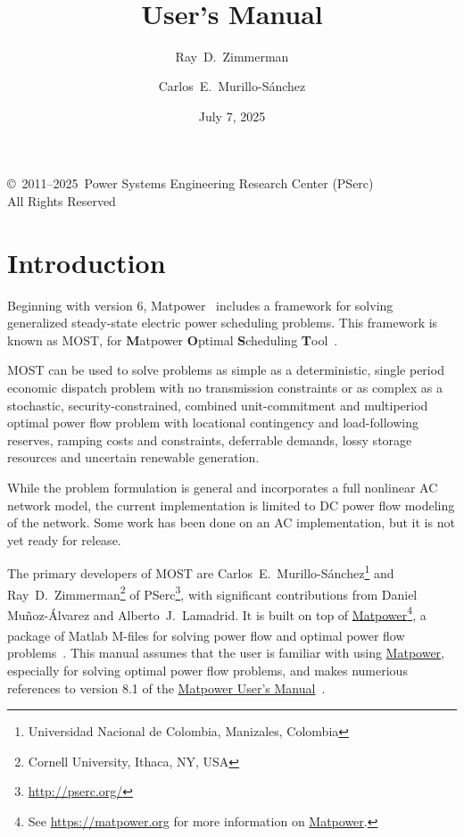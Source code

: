 \documentclass[12pt]{article}
\title{\mostname{}\\\most{} \mostver{}\\
User's Manual}
\author{Ray~D.~Zimmerman \and Carlos~E.~Murillo-S\'anchez}
\date{July 7, 2025} %
\newcommand{\mpver}[0]{8.1}
\newcommand{\matlab}[0]{{\sc Matlab}}
\newcommand{\matpower}[0]{{\sc Matpower}}
\newcommand{\matpowerurl}[0]{https://matpower.org}
\newcommand{\matpowerlink}[0]{\href{\matpowerurl}{\matpower{}}}
\newcommand{\most}[0]{{MOST}}
\newcommand{\mostname}[0]{{{\bf M}{\sc atpower} \textbf{O}ptimal \textbf{S}cheduling \textbf{T}ool}}
\newcommand{\pserc}[0]{{\sc PSerc}}
\newcommand{\PSERC}[0]{{Power Systems Engineering Research Center (\pserc{})}}
\newcommand{\mumurl}[0]{https://matpower.org/docs/MATPOWER-manual-\mpver.pdf}
\newcommand{\mum}[0]{\href{\mumurl}{\matpower{} User's Manual}}
\numberwithin{equation}{section}
\numberwithin{table}{section}
\numberwithin{figure}{section}
\begin{document}
\maketitle
\thispagestyle{empty}
\vfill
\begin{center}
{\scriptsize
\copyright~2011--2025~\PSERC{}\\
All Rights Reserved}
\end{center}

\clearpage
\tableofcontents
\clearpage
\listoffigures
\listoftables

\clearpage
\section{Introduction}

Beginning with version 6, \matpower{}~\cite{zimmerman2011,matpower,matpower_manual} includes a framework for solving generalized steady-state electric power scheduling problems. This framework is known as \most{}, for \mostname{}~\cite{murillo-sanchez2013a,lamadrid2018}.

\most{} can be used to solve problems as simple as a deterministic, single period economic dispatch problem with no transmission constraints or as complex as a stochastic, security-constrained, combined unit-commitment and multiperiod optimal power flow problem with locational contingency and load-following reserves, ramping costs and constraints, deferrable demands, lossy storage resources and uncertain renewable generation.

While the problem formulation is general and incorporates a full nonlinear AC network model, the current implementation is limited to DC power flow modeling of the network. Some work has been done on an AC implementation, but it is not yet ready for release.

The primary developers of \most{} are Carlos~E.~Murillo-S\'anchez\footnote{Universidad Nacional de Colombia, Manizales, Colombia} and Ray~D.~Zimmerman\footnote{Cornell University, Ithaca, NY, USA} of \pserc{}\footnote{\url{http://pserc.org/}}, with significant contributions from Daniel Mu\~noz-\'Alvarez and Alberto~J.~Lamadrid. It is built on top of \matpowerlink{}\footnote{See \url{\matpowerurl} for more information on \matpowerlink{}.}, a package of \matlab{}\textsuperscript{\tiny \textregistered} M-files for solving power flow and optimal power flow problems~\cite{zimmerman2011, zimmerman2009}. This manual assumes that the user is familiar with using \matpowerlink{}, especially for solving optimal power flow problems, and makes numerious references to version \mpver{} of the \mum{}~\cite{matpower_manual}.
\end{document}
